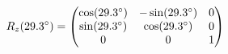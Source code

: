 \documentclass[preview]{standalone}
\begin{document}
\begin{align*}
\special{dvisvgm:raw <g id='unique000'>}R_z(29.3^\circ) = \begin{pmatrix} \cos(29.3^\circ) & -\sin(29.3^\circ) & 0 \\ \sin(29.3^\circ) & \cos(29.3^\circ) & 0 \\ 0 & 0 & 1 \end{pmatrix}\special{dvisvgm:raw </g>}
\end{align*}
\end{document}
